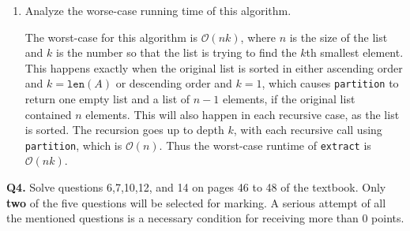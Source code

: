\documentclass[11pt]{article}
\begin{document}
\begin{enumerate}[label=(\alph*)]
\begin{proof}
            Thus the program returns the correct output for lists of size \(n+1\), and by the principle of complete induction, the program is correct.
            
        \end{proof}
        \item Analyze the worse-case running time of this algorithm.
        
        The worst-case for this algorithm is \(\mathcal{O} (nk)\), where \(n\) is the size of the list and \(k\) is the number so that the list is trying to find the \(k\)th smallest element. This happens exactly when the original list is sorted in either ascending order and \(k=\texttt{len}(A)\) or descending order and \(k=1\), which causes \verb|partition| to return one empty list and a list of \(n-1\) elements, if the original list contained \(n\) elements. This will also happen in each recursive case, as the list is sorted. The recursion goes up to depth \(k\), with each recursive call using \verb|partition|, which is \(\mathcal{O} (n)\). Thus the worst-case runtime of \verb|extract| is \(\mathcal{O} (nk)\).
    \end{enumerate}
    \pagebreak
    \textbf{Q4.} Solve questions 6,7,10,12, and 14 on pages 46 to 48 of the textbook. Only \textbf{two} of the five questions will be selected for marking. A serious attempt of all the mentioned questions is a necessary condition for receiving more than 0 points.
\end{document}
